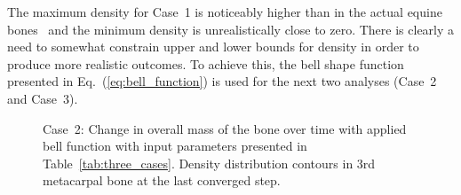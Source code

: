 \documentclass[11pt]{acmeArticle}
\numberwithin{equation}{section}
\begin{document}
The maximum density for Case~1 is noticeably higher than in the actual equine bones~\citep{yamada2015experimental} and the minimum density is unrealistically close to zero. 
There is clearly a need to somewhat constrain upper and lower bounds for density in order to produce more realistic outcomes.
To achieve this, the bell shape function presented in Eq.~(\ref{eq:bell_function}) is used for the next two analyses (Case~2 and Case~3). 

\begin{figure}[h!]
\centering
		\caption{Case~2: Change in overall mass of the bone over time with applied bell function with input parameters presented in Table~\ref{tab:three_cases}. Density distribution contours in 3rd metacarpal bone at the last converged step.}
		\label{fig:density_bell1}
\end{figure}
\end{document}
